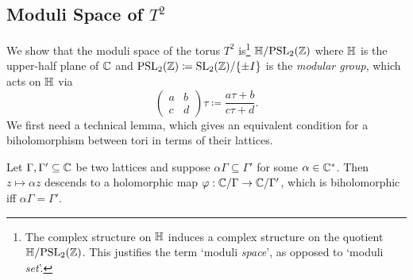 \documentclass[../Moduli_Spaces_of_Riemann_Surfaces.tex]{subfiles}
\begin{document}
    \subsection{Moduli Space of $T^2$}
    We show that the moduli space of the torus $T^2$ is\footnote{The complex structure on $\mathbb{H}$ induces a complex structure on the quotient $\mathbb{H}/\!\operatorname{PSL}_{2}\!\left(\mathbb{Z}\right)$. This justifies the term `moduli \textit{space}', as opposed to `moduli \textit{set}'.} $\mathbb{H}/\!\operatorname{PSL}_{2}\!\left(\mathbb{Z}\right)$ where $\mathbb{H}$ is the upper-half plane of $\mathbb{C}$ and $\operatorname{PSL}_{2}\!\left(\mathbb{Z}\right)\coloneqq\operatorname{SL}_2\!\left(\mathbb{Z}\right)\!/\!\left\{\pm I\right\}$ is the \textit{modular group}, which acts on $\mathbb{H}$ via
    \begin{equation*}
        \begin{pmatrix}
            a & b \\
            c & d
        \end{pmatrix}\tau\coloneqq\frac{a\tau+b}{c\tau+d}.
    \end{equation*}
    We first need a technical lemma, which gives an equivalent condition for a biholomorphism between tori in terms of their lattices.
    \begin{lemma}\label{MS:lem:moduli_space_torus_1}
        Let $\Gamma,\Gamma'\subseteq\mathbb{C}$ be two lattices and suppose $\alpha\Gamma\subseteq\Gamma'$ for some $\alpha\in\mathbb{C}^\ast$. Then $z\mapsto\alpha z$ descends to a holomorphic map $\varphi:\mathbb{C}/\Gamma\to\mathbb{C}/\Gamma'$, which is biholomorphic iff $\alpha\Gamma=\Gamma'$.
    \end{lemma}
\end{document}
